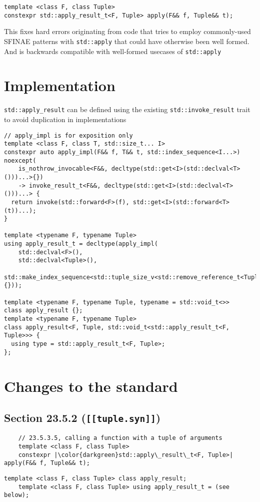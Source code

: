 \documentclass{article}
\begin{document}
\begin{lstlisting}
template <class F, class Tuple>
constexpr std::apply_result_t<F, Tuple> apply(F&& f, Tuple&& t);
\end{lstlisting}

This fixes hard errors originating from code that tries to employ commonly-used
SFINAE patterns with \texttt{std::apply} that could have otherwise been well
formed.  And is backwards compatible with well-formed usecases of
\texttt{std::apply}

\section{Implementation}
\texttt{std::apply\_result} can be defined using the existing
\texttt{std::invoke\_result} trait to avoid duplication in implementations

\begin{lstlisting}
// apply_impl is for exposition only
template <class F, class T, std::size_t... I>
constexpr auto apply_impl(F&& f, T&& t, std::index_sequence<I...>) noexcept(
    is_nothrow_invocable<F&&, decltype(std::get<I>(std::declval<T>()))...>{})
    -> invoke_result_t<F&&, decltype(std::get<I>(std::declval<T>()))...> {
  return invoke(std::forward<F>(f), std::get<I>(std::forward<T>(t))...);
}

template <typename F, typename Tuple>
using apply_result_t = decltype(apply_impl(
    std::declval<F>(),
    std::declval<Tuple>(),
    std::make_index_sequence<std::tuple_size_v<std::remove_reference_t<Tuple>>>{}));

template <typename F, typename Tuple, typename = std::void_t<>>
class apply_result {};
template <typename F, typename Tuple>
class apply_result<F, Tuple, std::void_t<std::apply_result_t<F, Tuple>>> {
  using type = std::apply_result_t<F, Tuple>;
};
\end{lstlisting}

\section{Changes to the standard}
\subsection{Section 23.5.2 (\texttt{[[tuple.syn]]})}
\begin{lstlisting}
    // 23.5.3.5, calling a function with a tuple of arguments
    template <class F, class Tuple>
    constexpr |\color{darkgreen}std::apply\_result\_t<F, Tuple>| apply(F&& f, Tuple&& t);
\end{lstlisting}
\begin{lstlisting}[style=base]
    template <class F, class Tuple> class apply_result;
    template <class F, class Tuple> using apply_result_t = (see below);
\end{lstlisting}
\end{document}
